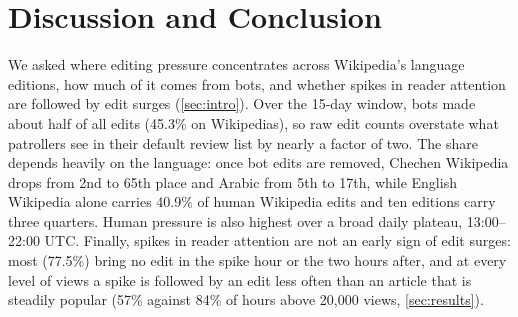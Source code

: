 \section{Discussion and Conclusion}\label{sec:discussion}

We asked where editing pressure concentrates across Wikipedia's language editions, how much of it
comes from bots, and whether spikes in reader attention are followed by edit surges
(\cref{sec:intro}). Over the 15-day window, bots made about half of all edits (45.3\% on Wikipedias),
so raw edit counts overstate what patrollers see in their default review list by nearly a factor of two. The share depends heavily on
the language: once bot edits are removed, Chechen Wikipedia drops from 2nd to 65th place and Arabic from
5th to 17th, while English Wikipedia alone carries 40.9\% of human Wikipedia edits and ten editions carry
three quarters. Human pressure is also highest over a broad daily plateau, 13:00--22:00 UTC. Finally,
spikes in reader attention are not an early sign of edit surges: most (77.5\%) bring no edit in the spike
hour or the two hours after,
and at every level of views a spike is followed by an edit less often than an article that is steadily
popular (57\% against 84\% of hours above 20{,}000 views, \cref{sec:results}).

